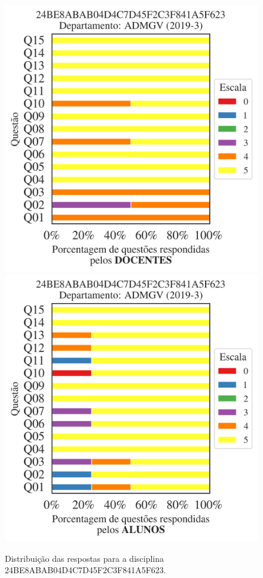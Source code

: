 \documentclass[a4paper,10pt]{article}
\begin{document}
\begin{figure}[h]
\centering
\includegraphics[width=0.485\linewidth]{analise_disciplina_departamento_ADMGV_24BE8ABAB04D4C7D45F2C3F841A5F623_docentes.png}
\includegraphics[width=0.485\linewidth]{analise_disciplina_departamento_ADMGV_24BE8ABAB04D4C7D45F2C3F841A5F623_alunos.png}
\caption{\label{fig:analise_geral_departamento}                Distribuição das respostas para a disciplina 24BE8ABAB04D4C7D45F2C3F841A5F623. }
\end{figure}
\end{document}
